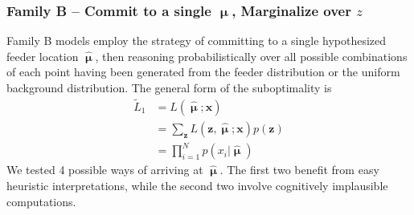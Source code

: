 \documentclass{article}
\newcommand{\mu}{\boldsymbol\upmu}
\begin{document}
\subsubsection*{Family B -- Commit to a single $\mu$, Marginalize over $z$} 
Family B models employ the strategy of committing to a single hypothesized feeder location $\hat{\mu}$, then reasoning probabilistically over all possible combinations of each point having been generated from the feeder distribution or the uniform background distribution. The general form of the suboptimality is 
\begin{align*}
    \tilde{L}_1 &= L(\hat{\mu};\mathbf{x})\\
    &= \sum_\mathbf{z}L(\mathbf{z},\hat{\mu};\mathbf{x})p(\mathbf{z})\\
    &= \prod^N_{i=1}p(x_i|\hat{\mu})
\end{align*}
We tested 4 possible ways of arriving at $\hat{\mu}$. The first two benefit from easy heuristic interpretations, while the second two involve cognitively implausible computations. 
\end{document}
